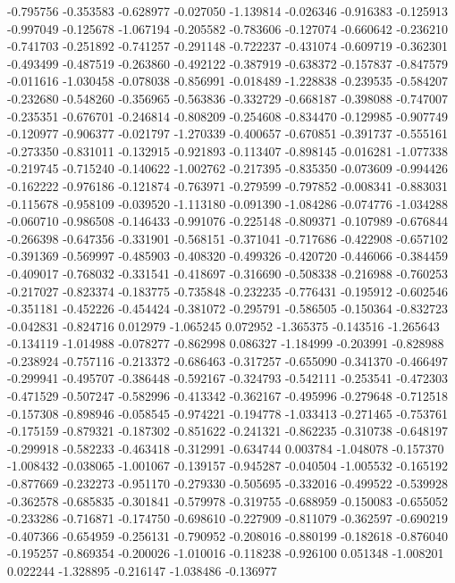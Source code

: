 -0.795756
-0.353583
-0.628977
-0.027050
-1.139814
-0.026346
-0.916383
-0.125913
-0.997049
-0.125678
-1.067194
-0.205582
-0.783606
-0.127074
-0.660642
-0.236210
-0.741703
-0.251892
-0.741257
-0.291148
-0.722237
-0.431074
-0.609719
-0.362301
-0.493499
-0.487519
-0.263860
-0.492122
-0.387919
-0.638372
-0.157837
-0.847579
-0.011616
-1.030458
-0.078038
-0.856991
-0.018489
-1.228838
-0.239535
-0.584207
-0.232680
-0.548260
-0.356965
-0.563836
-0.332729
-0.668187
-0.398088
-0.747007
-0.235351
-0.676701
-0.246814
-0.808209
-0.254608
-0.834470
-0.129985
-0.907749
-0.120977
-0.906377
-0.021797
-1.270339
-0.400657
-0.670851
-0.391737
-0.555161
-0.273350
-0.831011
-0.132915
-0.921893
-0.113407
-0.898145
-0.016281
-1.077338
-0.219745
-0.715240
-0.140622
-1.002762
-0.217395
-0.835350
-0.073609
-0.994426
-0.162222
-0.976186
-0.121874
-0.763971
-0.279599
-0.797852
-0.008341
-0.883031
-0.115678
-0.958109
-0.039520
-1.113180
-0.091390
-1.084286
-0.074776
-1.034288
-0.060710
-0.986508
-0.146433
-0.991076
-0.225148
-0.809371
-0.107989
-0.676844
-0.266398
-0.647356
-0.331901
-0.568151
-0.371041
-0.717686
-0.422908
-0.657102
-0.391369
-0.569997
-0.485903
-0.408320
-0.499326
-0.420720
-0.446066
-0.384459
-0.409017
-0.768032
-0.331541
-0.418697
-0.316690
-0.508338
-0.216988
-0.760253
-0.217027
-0.823374
-0.183775
-0.735848
-0.232235
-0.776431
-0.195912
-0.602546
-0.351181
-0.452226
-0.454424
-0.381072
-0.295791
-0.586505
-0.150364
-0.832723
-0.042831
-0.824716
0.012979
-1.065245
0.072952
-1.365375
-0.143516
-1.265643
-0.134119
-1.014988
-0.078277
-0.862998
0.086327
-1.184999
-0.203991
-0.828988
-0.238924
-0.757116
-0.213372
-0.686463
-0.317257
-0.655090
-0.341370
-0.466497
-0.299941
-0.495707
-0.386448
-0.592167
-0.324793
-0.542111
-0.253541
-0.472303
-0.471529
-0.507247
-0.582996
-0.413342
-0.362167
-0.495996
-0.279648
-0.712518
-0.157308
-0.898946
-0.058545
-0.974221
-0.194778
-1.033413
-0.271465
-0.753761
-0.175159
-0.879321
-0.187302
-0.851622
-0.241321
-0.862235
-0.310738
-0.648197
-0.299918
-0.582233
-0.463418
-0.312991
-0.634744
0.003784
-1.048078
-0.157370
-1.008432
-0.038065
-1.001067
-0.139157
-0.945287
-0.040504
-1.005532
-0.165192
-0.877669
-0.232273
-0.951170
-0.279330
-0.505695
-0.332016
-0.499522
-0.539928
-0.362578
-0.685835
-0.301841
-0.579978
-0.319755
-0.688959
-0.150083
-0.655052
-0.233286
-0.716871
-0.174750
-0.698610
-0.227909
-0.811079
-0.362597
-0.690219
-0.407366
-0.654959
-0.256131
-0.790952
-0.208016
-0.880199
-0.182618
-0.876040
-0.195257
-0.869354
-0.200026
-1.010016
-0.118238
-0.926100
0.051348
-1.008201
0.022244
-1.328895
-0.216147
-1.038486
-0.136977
